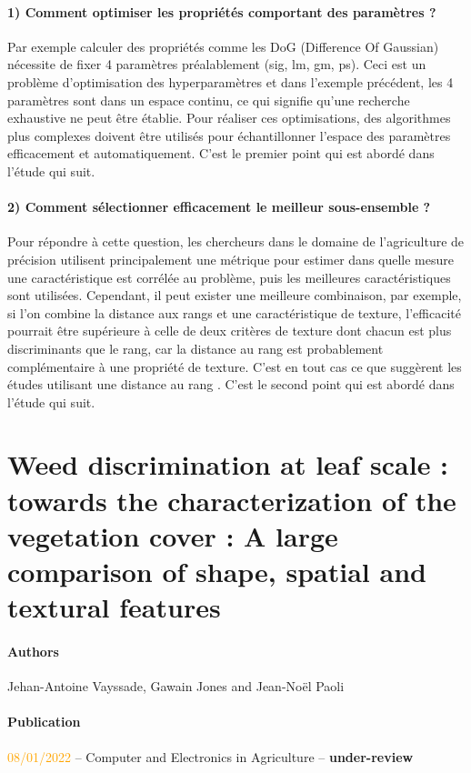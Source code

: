 \documentclass[../thesis.tex]{subfiles}
\begin{document}
    \paragraph{1) Comment optimiser les propriétés comportant des paramètres ?} Par exemple calculer des propriétés comme les DoG (Difference Of Gaussian) nécessite de fixer 4 paramètres préalablement (sig, lm, gm, ps). Ceci est un problème d'optimisation des hyperparamètres et dans l'exemple précédent, les 4 paramètres sont dans un espace continu, ce qui signifie qu'une recherche exhaustive ne peut être établie. Pour réaliser ces optimisations, des algorithmes plus complexes doivent être utilisés pour échantillonner l'espace des paramètres efficacement et automatiquement. C'est le premier point qui est abordé dans l'étude qui suit.
    \paragraph{2) Comment sélectionner efficacement le meilleur sous-ensemble ?} Pour répondre à cette question, les chercheurs dans le domaine de l'agriculture de précision utilisent principalement une métrique pour estimer dans quelle mesure une caractéristique est corrélée au problème, puis les meilleures caractéristiques sont utilisées. Cependant, il peut exister une meilleure combinaison, par exemple, si l'on combine la distance aux rangs et une caractéristique de texture, l'efficacité pourrait être supérieure à celle de deux critères de texture dont chacun est plus discriminants que le rang, car la distance au rang est probablement complémentaire à une propriété de texture. C'est en tout cas ce que suggèrent les études utilisant une distance au rang \cite{rs10050761}. C'est le second point qui est abordé dans l'étude qui suit.
	
	\newpage
    \null
    \vfill
	\section*{Weed discrimination at leaf scale : towards the characterization of the vegetation  cover : A large comparison of shape, spatial and textural features}
	
	\paragraph{Authors} Jehan-Antoine Vayssade, Gawain Jones and Jean-Noël Paoli
	
	\paragraph{Publication} \textcolor{orange}{08/01/2022} -- Computer and Electronics in Agriculture -- \textbf{under-review}
		
\end{document}
